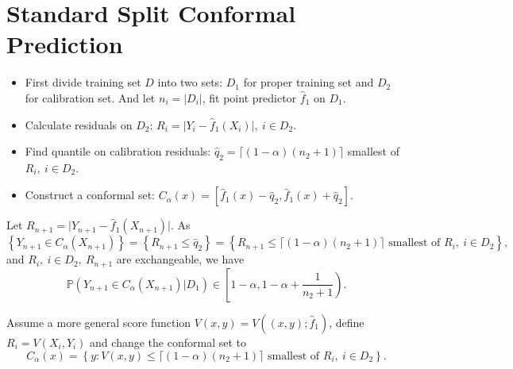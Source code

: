 \documentclass[12pt, a4paper, oneside]{article}
\begin{document}
\section{Standard Split Conformal Prediction}
    \begin{itemize}
        \item First divide training set $D$ into two sets: $D_1$ for proper training set and $D_2$ for calibration set. And let $n_i=|D_i|$, fit point predictor $\hat{f}_1$ on $D_1$.
        \item Calculate residuals on $D_2$: $R_i=\Big|Y_i-\hat{f}_1(X_i)\Big|,\ i\in D_2$.
        \item Find quantile on calibration residuals: $\hat{q}_2=\lceil (1-\alpha)(n_2+1)\rceil$ smallest of $R_i,\ i\in D_2$.
        \item Construct a conformal set: $C_\alpha(x)=\left[ \hat{f}_1(x)-\hat{q}_2,\hat{f}_1(x)+\hat{q}_2 \right]$.
    \end{itemize}


    Let $R_{n+1}=\Big|Y_{n+1}-\hat{f}_1(X_{n+1})\Big|$. As
    \begin{equation*}
        \left\{ Y_{n+1}\in C_\alpha(X_{n+1}) \right\}=\left\{ R_{n+1}\leq\hat{q}_2 \right\}=\left\{ R_{n+1}\leq\lceil (1-\alpha)(n_2+1)\rceil\text{ smallest of }R_i,\ i\in D_2 \right\},
    \end{equation*}
    and $R_i,\ i\in D_2,\ R_{n+1}$ are exchangeable, we have
    \begin{equation*}
        \mathbb{P}\left( Y_{n+1}\in C_\alpha(X_{n+1})\Big|D_1 \right)\in\left[ 1-\alpha,1-\alpha+\dfrac{1}{n_2+1} \right).
    \end{equation*}


    Assume a more general score function $V(x,y)=V((x,y);\hat{f}_1)$, define $R_i=V(X_i,Y_i)$ and change the conformal set to
    \begin{equation*}
        C_\alpha(x)=\left\{ y:V(x,y)\leq\lceil (1-\alpha)(n_2+1)\rceil\text{ smallest of }R_i,\ i\in D_2 \right\}.
    \end{equation*}
\end{document}
